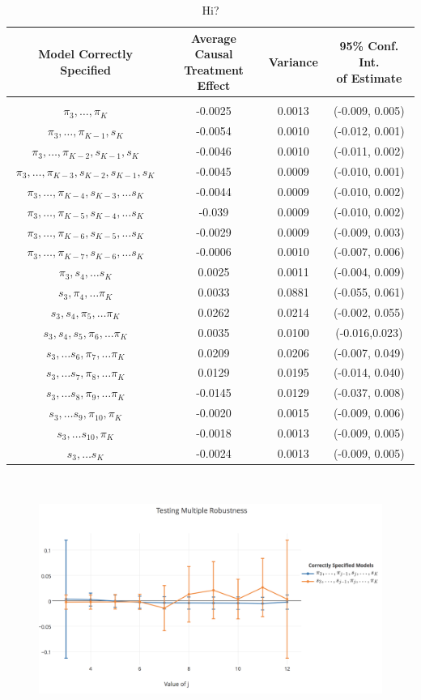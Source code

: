 \begin{table}[h!]
\centering
\begin{tabular} {c | c  c c}
Model Correctly Specified & \shortstack{Average Causal \\ Treatment Effect}  & Variance & \shortstack{95\% Conf. Int.\\ of Estimate} \\ 
\hline  \\
$\pi_3, \dots, \pi_K$ & -0.0025 & 0.0013 & (-0.009, 0.005)  \\ 
$\pi_3, \dots, \pi_{K-1}, s_K$ & -0.0054 & 0.0010& (-0.012, 0.001)\\ 
$\pi_3, \dots, \pi_{K-2}, s_{K-1}, s_K$ & -0.0046 & 0.0010&(-0.011, 0.002)\\ 
$\pi_3, \dots, \pi_{K-3}, s_{K-2} , s_{K-1}, s_K$ & -0.0045 &0.0009 & (-0.010, 0.001)\\ 
$\pi_3, \dots, \pi_{K-4}, s_{K-3}, \dots s_K $ & -0.0044 &0.0009& (-0.010, 0.002) \\ 
$\pi_3, \dots, \pi_{K-5}, s_{K-4}, \dots s_K $ & -0.039 &0.0009& (-0.010, 0.002)\\ 
$\pi_3, \dots, \pi_{K-6}, s_{K-5}, \dots s_K $ & -0.0029 & 0.0009&(-0.009, 0.003) \\ 
$\pi_3, \dots, \pi_{K-7}, s_{K-6}, \dots s_K $ & -0.0006 & 0.0010& (-0.007, 0.006)\\ 
$\pi_3, s_{4}, \dots s_K $ & 0.0025 & 0.0011 & (-0.004, 0.009) \\ 
$s_3, \pi_4, \dots \pi_K$ & 0.0033 & 0.0881 & (-0.055, 0.061)\\ 
$s_3, s_4, \pi_5, \dots \pi_K$ & 0.0262 & 0.0214  & (-0.002, 0.055)\\ 
$s_3, s_4, s_5, \pi_6, \dots \pi_K$ & 0.0035 & 0.0100 & (-0.016,0.023) \\ 
$s_3, \dots s_6, \pi_7, \dots \pi_K$ & 0.0209 &0.0206 & (-0.007, 0.049)\\ 
$s_3, \dots s_7, \pi_8, \dots \pi_K$ & 0.0129 &  0.0195   & (-0.014, 0.040) \\ 
$s_3, \dots s_8, \pi_9, \dots \pi_K$ & -0.0145 &0.0129   & (-0.037, 0.008) \\ 
$s_3, \dots s_9, \pi_{10}, \pi_K$ & -0.0020 & 0.0015 & (-0.009, 0.006)\\ 
$s_3, \dots s_{10}, \pi_K$ & -0.0018& 0.0013 & (-0.009,  0.005)\\
$s_3, \dots s_K$ & -0.0024 & 0.0013& (-0.009, 0.005)\\ 
\end{tabular} \\
\centering
\caption{Hi?}
\end{table}

\begin{figure}
\includegraphics[width = \linewidth]{figures/multiplerobust.png}
\caption{}
\label{multirobust}
\end{figure} 

